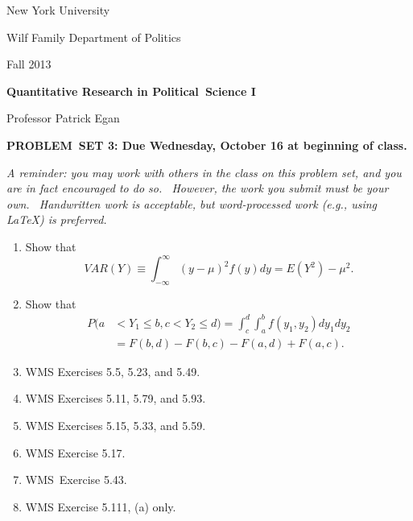 \documentclass[11pt]{article}
\begin{document}
New York University

Wilf Family Department of Politics

Fall 2013\medskip \medskip 

\begin{center}
{\large \textbf{Quantitative Research in Political\ Science I}}

Professor Patrick Egan

\bigskip

\textbf{PROBLEM\ SET 3: Due Wednesday, October 16 at beginning of class.}
\end{center}

\textit{A reminder: you may work with others in the class on this problem
set, and you are in fact encouraged to do so. \ However, the work you submit
must be your own. \ Handwritten work is acceptable, but word-processed work
(e.g., using LaTeX) is preferred.}

\bigskip

\begin{enumerate}
\item Show that%
\begin{equation*}
VAR(Y)\equiv \int_{-\infty }^{\infty }(y-\mu )^{2}f(y)dy=E(Y^{2})-\mu ^{2}.
\end{equation*}%
\medskip 

\item Show that%
\begin{align*}
P(a& <Y_{1}\leq b,c<Y_{2}\leq
d)=\int_{c}^{d}\int_{a}^{b}f(y_{1},y_{2})dy_{1}dy_{2} \\
& =F(b,d)-F(b,c)-F(a,d)+F(a,c).
\end{align*}%
\medskip 

\item WMS Exercises 5.5, 5.23, and 5.49.\medskip 

\item WMS Exercises 5.11, 5.79, and 5.93.\medskip 

\item WMS Exercises 5.15, 5.33, and 5.59.\medskip 

\item WMS Exercise 5.17.\medskip 

\item WMS\ Exercise 5.43.\medskip 

\item WMS Exercise 5.111, (a) only.
\end{enumerate}
\end{document}
